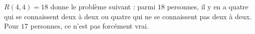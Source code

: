 $R(4, 4) = 18$ donne le problème suivant : parmi $18$ personnes, il y en a quatre qui se connaissent deux à deux ou quatre qui ne se connaissent pas deux à deux. Pour $17$ personnes, ce n'est pas forcément vrai.
